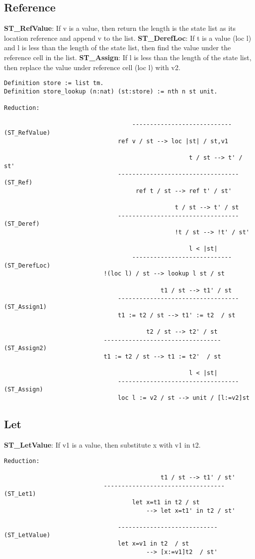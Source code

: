 \subsection{Reference}
\textbf{ST_RefValue}: If v is a value, then return the length is the state list as its location reference and append v to the list.
\textbf{ST_DerefLoc}: If t is a value (loc l) and l is less than the length of the state list, then find the value under the reference cell in the list.
\textbf{ST_Assign}: If l is less than the length of the state list, then replace the value under reference cell (loc l) with v2.
\begin{lstlisting}
Definition store := list tm.
Definition store_lookup (n:nat) (st:store) := nth n st unit.

Reduction:

									----------------------------   (ST_RefValue)
								ref v / st --> loc |st| / st,v1

													t / st --> t' / st'
								----------------------------------  (ST_Ref)
								     ref t / st --> ref t' / st'
								
												t / st --> t' / st
								----------------------------------  (ST_Deref)
												!t / st --> !t' / st'
								
													l < |st|
									----------------------------   (ST_DerefLoc)
							!(loc l) / st --> lookup l st / st
								
											t1 / st --> t1' / st
								----------------------------------  (ST_Assign1)
								t1 := t2 / st --> t1' := t2  / st
								
										t2 / st --> t2' / st
							---------------------------------   (ST_Assign2)
							t1 := t2 / st --> t1 := t2'  / st
								
													l < |st|
								----------------------------------  (ST_Assign)
								loc l := v2 / st --> unit / [l:=v2]st

\end{lstlisting}

\subsection{Let}
\textbf{ST_LetValue}: If v1 is a value, then substitute x with v1 in t2.
\begin{lstlisting}
Reduction:

											t1 / st --> t1' / st'
							----------------------------------  (ST_Let1)
									let x=t1 in t2 / st 
										--> let x=t1' in t2 / st'
						
								----------------------------   (ST_LetValue)
								let x=v1 in t2  / st 
										--> [x:=v1]t2  / st'
\end{lstlisting}

